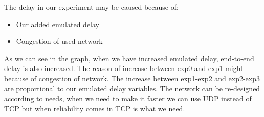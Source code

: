 The delay in our experiment may be caused because of:\\
\begin{itemize}
\item Our added emulated delay
\item Congestion of used network
\end {itemize}

As we can see in the graph, when we have increased emulated delay, end-to-end delay is also increased. The reason of increase between exp0 and exp1 might because of congestion of network. The increase between exp1-exp2 and exp2-exp3 are proportional to our emulated delay variables. The network can be re-designed according to needs, when we need to make it faster we can use UDP instead of TCP but when reliability comes in TCP is what we need.

